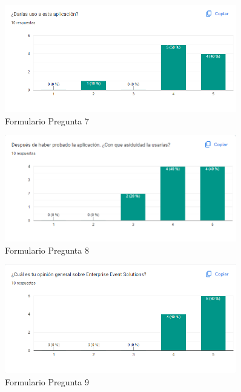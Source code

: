 \begin{figure}[h]
    \centering
    \includegraphics[width=0.9\textwidth]{Form7.png} 
    \caption{Formulario Pregunta 7}
    \label{fig:form7}
\end{figure}
\begin{figure}[h]
    \centering
    \includegraphics[width=0.9\textwidth]{Form8.png} 
    \caption{Formulario Pregunta 8}
    \label{fig:form8}
\end{figure}
\begin{figure}[h]
    \centering
    \includegraphics[width=0.9\textwidth]{Form9.png} 
    \caption{Formulario Pregunta 9}
    \label{fig:form9}
\end{figure}
